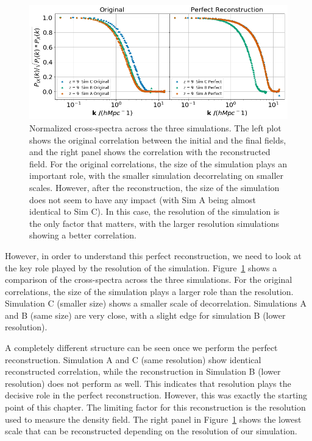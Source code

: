 \begin{figure}
    \centering
    \includegraphics[width=1\columnwidth]{images/perfRecon/simComp.png}%
    
    \caption{
    Normalized cross-spectra across the three simulations. The left plot shows the original correlation between the initial and the final fields, and the right panel shows the correlation with the reconstructed field. For the original correlations, the size of the simulation plays an important role, with the smaller simulation decorrelating on smaller scales. However, after the reconstruction, the size of the simulation does not seem to have any impact (with Sim A being almost identical to Sim C). In this case, the resolution of the simulation is the only factor that matters, with the larger resolution simulations showing a better correlation.
    }
    
    \label{fig:3.3}
\end{figure}
However, in order to understand this perfect reconstruction, we need to look at the key role played by the resolution of the simulation. Figure~\ref{fig:3.3} shows a comparison of the cross-spectra across the three simulations. For the original correlations, the size of the simulation plays a larger role than the resolution. Simulation C (smaller size) shows a smaller scale of decorrelation. Simulations A and B (same size) are very close, with a slight edge for simulation B (lower resolution). 

A completely different structure can be seen once we perform the perfect reconstruction. Simulation A and C (same resolution) show identical reconstructed correlation, while the reconstruction in Simulation B (lower resolution) does not perform as well. This indicates that resolution plays the decisive role in the perfect reconstruction. However, this was exactly the starting point of this chapter. The limiting factor for this reconstruction is the resolution used to measure the density field. The right panel in Figure~\ref{fig:3.3} shows the lowest scale that can be reconstructed depending on the resolution of our simulation.

